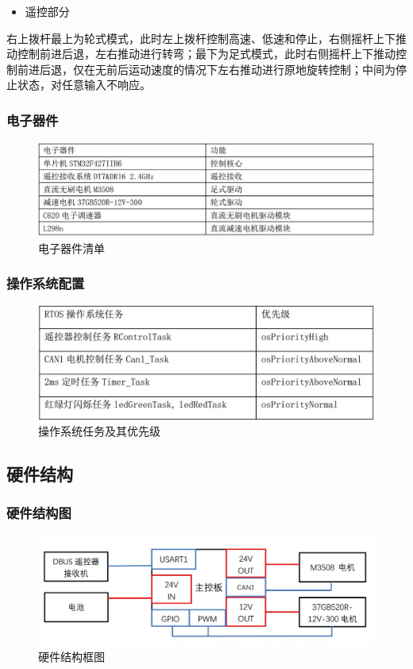 \documentclass[12pt]{article}
\begin{document}
\begin{CJK}{UTF8}{gbsn}
\begin{itemize}
\item 遥控部分
\end{itemize}\par
右上拨杆最上为轮式模式，此时左上拨杆控制高速、低速和停止，右侧摇杆上下推动控制前进后退，左右推动进行转弯；最下为足式模式，此时右侧摇杆上下推动控制前进后退，仅在无前后运动速度的情况下左右推动进行原地旋转控制；中间为停止状态，对任意输入不响应。
\subsubsection{电子器件}
 \begin{figure}[H]
\centering
\includegraphics[width=.9\textwidth]{chap5//fig2.jpg}
\caption{电子器件清单}
\end{figure}
\subsubsection{操作系统配置}
 \begin{figure}[H]
\centering
\includegraphics[width=.77\textwidth]{chap5//fig3.jpg}
\caption{操作系统任务及其优先级}
\end{figure}

\subsection{硬件结构}
\subsubsection{硬件结构图}
 \begin{figure}[H]
\centering
\includegraphics[width=.95\textwidth]{chap5//fig4.jpg}
\caption{硬件结构框图}
\end{figure}

\end{CJK}
\end{document}
